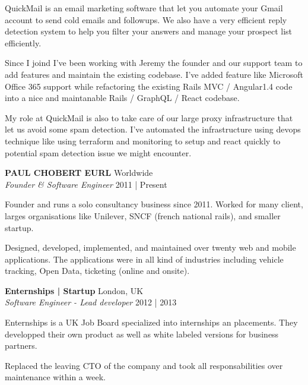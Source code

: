 \documentclass[a4paper]{article}
\begin{document}
QuickMail is an email marketing software that let you automate your Gmail account to send cold emails and followups.
We also have a very efficient reply detection system to help you filter your answers and manage your prospect list efficiently.

Since I joind I've been working with Jeremy the founder and our support team
to add features and maintain the existing codebase.
I've added feature like Microsoft Office 365 support while refactoring the existing
Rails MVC / Angular1.4 code into a nice and maintanable Rails / GraphQL / React codebase.

My role at QuickMail is also to take care of our large proxy infrastructure that let us avoid some spam detection.
I've automated the infrastructure using devops technique like using terraform and monitoring to setup and react quickly
to potential spam detection issue we might encounter.


\vspace{2mm}

\textbf{PAUL CHOBERT EURL} \hfill Worldwide\\
\textit{Founder \& Software Engineer} \hfill 2011 | Present\\
\vspace{2mm}

Founder and runs a solo consultancy business since 2011. Worked for many client, larges organisations like Unilever, SNCF (french national rails), and smaller startup.

Designed, developed, implemented, and maintained over twenty web and mobile applications.
The applications were in all kind of industries including vehicle tracking, Open Data, ticketing (online and onsite).

\vspace{2mm}

\textbf{Enternships | Startup} \hfill London, UK\\
\textit{Software Engineer - Lead developer} \hfill 2012 | 2013\\
\vspace{2mm}

\begin{itshape}
Enternships is a UK Job Board specialized into internships an placements.
They developped their own product as well as white labeled versions for business partners.
\end{itshape}

Replaced the leaving CTO of the company and took all responsabilities over maintenance within a week.
\end{document}
